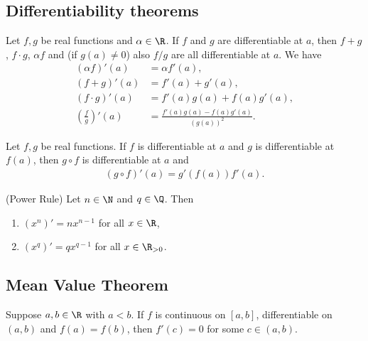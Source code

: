 \documentclass{article}
\begin{document}
\subsection{Differentiability theorems}

\begin{theorem}[Ross, 28.3]
	Let $f,g$ be real functions and $\alpha\in\R$. If $f$ and $g$ are
	differentiable at $a$, then $f+g$, $f\cdot g$, $\alpha f$ and
	(if $g(a)\not=0$) also $f/g$ are all differentiable at $a$. We have
	\begin{align*}
		(\alpha f)'(a)               & = \alpha f'(a),                        \\
		(f+g)'(a)                    & = f'(a) + g'(a),                       \\
		(f\cdot g)'(a)               & = f'(a)g(a)+f(a)g'(a),                 \\
		\left(\frac{f}{g}\right)'(a) & =\frac{f'(a)g(a)-f(a)g'(a)}{(g(a))^2}.
	\end{align*}
\end{theorem}

\begin{theorem}[Ross, 28.4]
	Let $f,g$ be real functions. If $f$ is differentiable at $a$ and $g$ is
	differentiable at $f(a)$, then $g\circ f$ is differentiable at $a$ and
	\begin{align*}
		(g\circ f)'(a) = g'(f(a))f'(a).
	\end{align*}
\end{theorem}

\begin{theorem}(Power Rule)
	Let $n\in \N$ and $q\in\Q$. Then
	\begin{enumerate}[label=(\arabic*)]
		\item $(x^n)'=nx^{n-1}$ for all $x\in\R$,
		\item $(x^q)'=qx^{q-1}$ for all $x\in\R_{>0}$.
	\end{enumerate}
\end{theorem}

\subsection{Mean Value Theorem}

\begin{theorem}
	Suppose $a,b\in\R$ with $a<b$. If $f$ is continuous on $[a,b]$,
	differentiable on $(a,b)$ and $f(a)=f(b)$, then $f'(c)=0$ for some
	$c\in(a,b)$.
\end{theorem}
\end{document}
